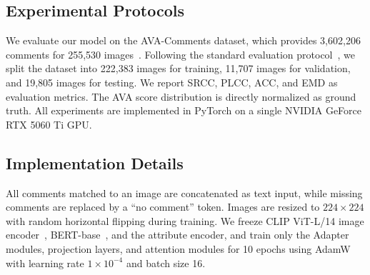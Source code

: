 \documentclass[journal]{IEEEtran}
\begin{document}
\subsection{Experimental Protocols}

We evaluate our model on the AVA-Comments dataset, which provides 3,602,206 comments for 255,530 images~\cite{murray2012ava}. Following the standard evaluation protocol~\cite{talebi2018nima,hou2025tcdg}, we split the dataset into 222,383 images for training, 11,707 images for validation, and 19,805 images for testing. We report SRCC, PLCC, ACC, and EMD as evaluation metrics. The AVA score distribution is directly normalized as ground truth. All experiments are implemented in PyTorch on a single NVIDIA GeForce RTX 5060 Ti GPU.

\subsection{Implementation Details}

All comments matched to an image are concatenated as text input, while missing comments are replaced by a ``no comment'' token. Images are resized to $224\times224$ with random horizontal flipping during training. We freeze CLIP ViT-L/14 image encoder~\cite{radford2021clip}, BERT-base~\cite{devlin2019bert}, and the attribute encoder, and train only the Adapter modules, projection layers, and attention modules for 10 epochs using AdamW with learning rate $1\times10^{-4}$ and batch size 16.
\end{document}
